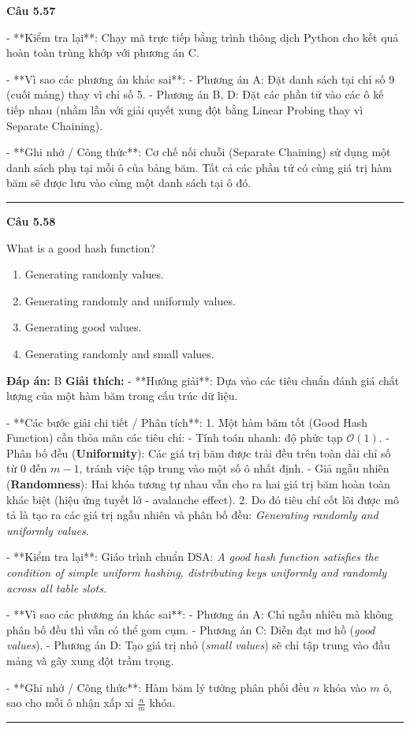 \documentclass[11pt,a4paper]{article}
\newenvironment{question}[1]{%
  \par\vspace{1em}\noindent\textbf{\large Câu #1}\par\vspace{0.4em}
}{%
  \par\vspace{1em}\hrule\vspace{0.6em}
}
\newenvironment{choices}{%
  \begin{enumerate}[label=\textbf{\Alph*.},leftmargin=2.2em,itemsep=2pt,topsep=3pt]
}{%
  \end{enumerate}
}
\newcommand{\choice}{\item}
\begin{document}
\begin{question}{5.57}
- **Kiểm tra lại**:
Chạy mã trực tiếp bằng trình thông dịch Python cho kết quả hoàn toàn trùng khớp với phương án C.


- **Vì sao các phương án khác sai**:
- Phương án A: Đặt danh sách tại chỉ số 9 (cuối mảng) thay vì chỉ số 5.
- Phương án B, D: Đặt các phần tử vào các ô kế tiếp nhau (nhầm lẫn với giải quyết xung đột bằng Linear Probing thay vì Separate Chaining).


- **Ghi nhớ / Công thức**:
Cơ chế nối chuỗi (Separate Chaining) sử dụng một danh sách phụ tại mỗi ô của bảng băm. Tất cả các phần tử có cùng giá trị hàm băm sẽ được lưu vào cùng một danh sách tại ô đó.
\end{question}

\begin{question}{5.58}
What is a good hash function?
\begin{choices}
\choice Generating randomly values.
\choice Generating randomly and uniformly values.
\choice Generating good values.
\choice Generating randomly and small values.
\end{choices}
\textbf{Đáp án:} B
\textbf{Giải thích:} - **Hướng giải**:
Dựa vào các tiêu chuẩn đánh giá chất lượng của một hàm băm trong cấu trúc dữ liệu.


- **Các bước giải chi tiết / Phân tích**:
1. Một hàm băm tốt (Good Hash Function) cần thỏa mãn các tiêu chí:
   - Tính toán nhanh: độ phức tạp \(\mathcal{O}(1)\).
   - Phân bố đều (\textbf{Uniformity}): Các giá trị băm được trải đều trên toàn dải chỉ số từ \(0\) đến \(m-1\), tránh việc tập trung vào một số ô nhất định.
   - Giả ngẫu nhiên (\textbf{Randomness}): Hai khóa tương tự nhau vẫn cho ra hai giá trị băm hoàn toàn khác biệt (hiệu ứng tuyết lở - avalanche effect).
2. Do đó tiêu chí cốt lõi được mô tả là tạo ra các giá trị ngẫu nhiên và phân bố đều: \textit{Generating randomly and uniformly values}.


- **Kiểm tra lại**:
Giáo trình chuẩn DSA: \textit{A good hash function satisfies the condition of simple uniform hashing, distributing keys uniformly and randomly across all table slots.}


- **Vì sao các phương án khác sai**:
- Phương án A: Chỉ ngẫu nhiên mà không phân bố đều thì vẫn có thể gom cụm.
- Phương án C: Diễn đạt mơ hồ (\textit{good values}).
- Phương án D: Tạo giá trị nhỏ (\textit{small values}) sẽ chỉ tập trung vào đầu mảng và gây xung đột trầm trọng.


- **Ghi nhớ / Công thức**:
Hàm băm lý tưởng phân phối đều \(n\) khóa vào \(m\) ô, sao cho mỗi ô nhận xấp xỉ \(\frac{n}{m}\) khóa.
\end{question}
\end{document}
